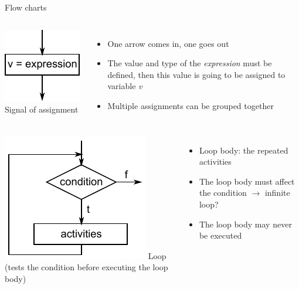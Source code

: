 \documentclass[usenames,dvipsnames,aspectratio=169]{beamer}
\begin{document}
\begin{frame}{Flow charts}
  \begin{columns}[T]
      \includegraphics{./assignment.pdf}
      Signal of assignment
      \begin{itemize}
        \item One arrow comes in, one goes out
        \item The value and type of the \emph{expression} must be defined, then this value is going to be assigned to variable \emph{v}
        \item Multiple assignments can be grouped together
      \end{itemize}
  \end{columns}
  \vfill
  \begin{columns}[T]
      \includegraphics{testBefore.pdf}
      Loop (tests the condition before executing the loop body)
      \begin{itemize}
        \item Loop body: the repeated activities
        \item The loop body must affect the condition $\to$ infinite loop?
        \item The loop body may never be executed
      \end{itemize}
  \end{columns}
\end{frame}
\end{document}
